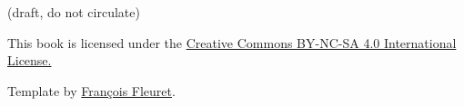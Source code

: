 \documentclass[oneside,11pt]{memoir}
\begin{document}


\nocite{do2016differential}
\nocite{montiel2009curves}
\nocite{tapp2016differential}
\nocite{thorpe2012elementary}
\nocite{JS}
\nocite{lima1981curso}
\nocite{stein2011fourier}
\nocite{do1992riemannian}
\nocite{do1998forms}

\printindex


\newpage


\ifdefined\draft
\begin{center}
  {\color{red} (draft, do not circulate)}
\end{center}
\else
This book is licensed under the
\href{https://creativecommons.org/licenses/by-nc-sa/4.0/}{Creative
  Commons BY-NC-SA 4.0 International License.}
\fi

Template by \href{https://fleuret.org/francois/}{François Fleuret}.



\checknbdrafts
\end{document}

